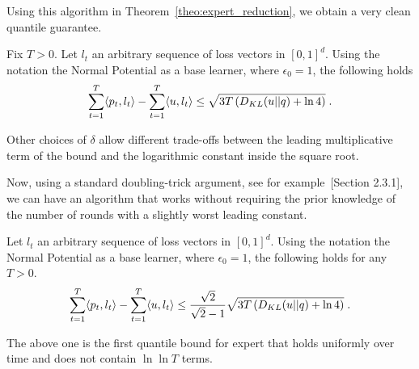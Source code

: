 Using this algorithm in Theorem~\ref{theo:expert_reduction}, we obtain a very clean quantile guarantee.
\begin{cor}
\label{cor:kt_expert}
Fix $T>0$. Let $l_t$ an arbitrary sequence of loss vectors in $[0,1]^d$. Using the notation the Normal Potential as a base learner, where $\epsilon_0=1$, the following holds
\[
\sum_{t=1}^T \langle p_t, l_t\rangle -\sum_{t=1}^T \langle u , l_t\rangle 
\leq \sqrt{3 T \left(D_{KL}(u||q) + \ln 4 \right)} \; .
\]
\end{cor}
Other choices of $\delta$ allow different trade-offs between the leading multiplicative term of the bound and the logarithmic constant inside the square root.

Now, using a standard doubling-trick argument, see for example~\citet{Shalev-Shwartz12}[Section 2.3.1], we can have an algorithm that works without requiring the prior knowledge of the number of rounds with a slightly worst leading constant.
\begin{cor}
\label{cor:kt_expert_no_t}
Let $l_t$ an arbitrary sequence of loss vectors in $[0,1]^d$. Using the notation the Normal Potential as a base learner, where $\epsilon_0=1$, the following holds for any $T>0$.
\[
\sum_{t=1}^T \langle p_t, l_t\rangle -\sum_{t=1}^T \langle u , l_t\rangle 
\leq \frac{\sqrt{2}}{\sqrt{2}-1}\sqrt{3 T \left(D_{KL}(u||q) + \ln 4 \right)} \; .
\]
\end{cor}
The above one is the first quantile bound for expert that holds uniformly over time and does not contain $\ln \ln T$ terms.